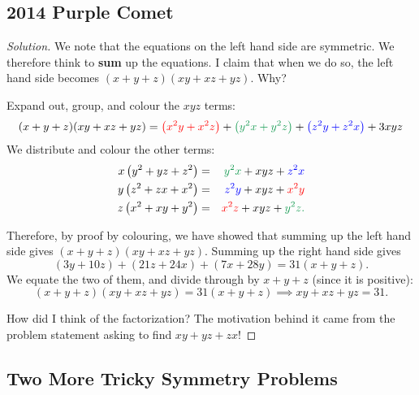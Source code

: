 \subsection{2014 Purple Comet}
\begin{proof}[Solution]
We note that the equations on the left hand side are symmetric. We therefore think to \textbf{sum} up the equations. I claim that when we do so, the left hand side becomes $(x+y+z)(xy+xz+yz)$. \color{red} Why? \color{black}

Expand out, group, and colour the $xyz$ terms: \begin{eqnarray*} (x+y+z)(xy+xz+yz)=\color{red}\left(x^2y+ x^2z\right)\color{black}+\color{ForestGreen}\left(y^2x+y^2z\right)\color{black}+\color{blue}\left(z^2y+z^2x\right)\color{black}+3xyz \end{eqnarray*} We distribute and colour the other terms: \begin{eqnarray*} x\left(y^2+yz+z^2\right)&=&\color{ForestGreen}y^2x\color{black}+xyz+\color{blue}z^2x \\ y\left(z^2+zx+x^2\right)&=&\color{blue}z^2y\color{black}+xyz+\color{red}x^2y \\ z\left(x^2+xy+y^2\right)&=&\color{red}x^2z\color{black}+xyz+\color{ForestGreen}y^2z. \end{eqnarray*}

\clearpage

Therefore, by proof by colouring, we have showed that summing up the left hand side gives $(x+y+z)(xy+xz+yz)$. Summing up the right hand side gives $$\left(3y+10z\right)+\left(21z+24x\right)+\left(7x+28y\right)=31\left(x+y+z\right).$$ We equate the two of them, and divide through by $x+y+z$ (since it is positive): $$(x+y+z)(xy+xz+yz)=31(x+y+z)\implies xy+xz+yz=\boxed{31}.$$ 

How did I think of the factorization? The motivation behind it came from the problem statement asking to find $xy+yz+zx$! \end{proof}
\clearpage

\subsection{Two More Tricky Symmetry Problems}

